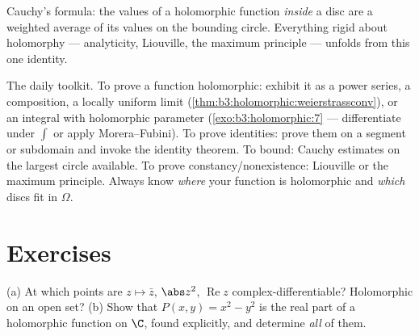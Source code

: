 \begin{omfigure}

{\small Cauchy's formula: the values of a holomorphic function
\emph{inside} a disc are a weighted average of its values on
the bounding circle. Everything rigid about holomorphy ---
analyticity, Liouville, the maximum principle --- unfolds from
this one identity.}
\end{omfigure}

\begin{method}\label{met:b3:holomorphic:toolkit}
The daily toolkit. To prove a function holomorphic: exhibit it
as a power series, a composition, a locally uniform limit
(\cref{thm:b3:holomorphic:weierstrassconv}), or an integral
with holomorphic parameter (\cref{exo:b3:holomorphic:7} ---
differentiate under $\int$ or apply Morera--Fubini). To prove
identities: prove them on a segment or subdomain and invoke
the identity theorem. To bound: Cauchy estimates on the
largest circle available. To prove constancy/nonexistence:
Liouville or the maximum principle. Always know \emph{where}
your function is holomorphic and \emph{which} discs fit in
$\Omega$.
\end{method}

\section{Exercises}

\begin{exercise}[$\star$]\label{exo:b3:holomorphic:1}
(a) At which points are $z \mapsto \bar z$, $\abs z^2$,
$\operatorname{Re}z$ complex-differentiable? Holomorphic on an
open set?
(b) Show that $P(x, y) = x^2 - y^2$ is the real part of a
holomorphic function on $\C$, found explicitly, and determine
\emph{all} of them.
\end{exercise}


